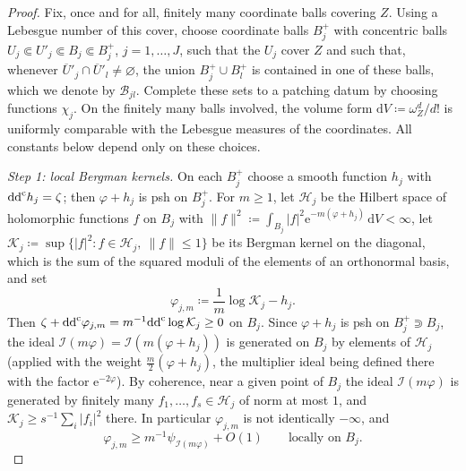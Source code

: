 \documentclass[11pt,a4paper]{amsart}
\theoremstyle{definition}
\begin{document}
\begin{proof}
Fix, once and for all, finitely many coordinate balls covering $Z$. Using a Lebesgue number of this cover, choose coordinate
balls $B_j^+$ with concentric balls $U_j\Subset U'_j\Subset B_j\Subset B_j^+$,
$j=1,\dots,J$, such that the $U_j$ cover $Z$ and such that, whenever
$\overline U{}'_j\cap\overline U{}'_l\ne\varnothing$, the union
$B_j^+\cup B_l^+$ is contained in one of these balls, which we
denote by $\mathcal B_{jl}$. Complete these sets to a patching datum by
choosing functions $\chi_j$. On the finitely many balls involved, the
volume form $\mathrm{d}V\coloneqq\omega_Z^d/d!$ is uniformly comparable
with the Lebesgue measures of the coordinates. All constants below depend
only on these choices.

\emph{Step 1: local Bergman kernels.} On each $B_j^+$ choose a smooth
function $h_j$ with $\mathrm{dd}^{\mathrm{c}} h_j=\zeta$; then $\varphi+h_j$ is psh on
$B_j^+$. For $m\ge1$, let $\mathcal H_{j}$ be the Hilbert space of
holomorphic functions $f$ on $B_j$ with
$\|f\|^2\coloneqq\int_{B_j}|f|^2\mathrm{e}^{-m(\varphi+h_j)}\,\mathrm{d}V<\infty$,
let $\mathcal K_j\coloneqq\sup\{|f|^2:f\in\mathcal H_j,\ \|f\|\le1\}$ be its
Bergman kernel on the diagonal, which is the sum of the squared moduli of
the elements of an orthonormal basis, and set
\[
  \varphi_{j,m}\coloneqq\frac1m\log\mathcal K_j-h_j .
\]
Then $\zeta+\mathrm{dd}^{\mathrm{c}}\varphi_{j,m}=m^{-1}\mathrm{dd}^{\mathrm{c}}\log\mathcal K_j\ge0$ on $B_j$. Since
$\varphi+h_j$ is psh on $B_j^+\Supset B_j$, the ideal
$\mathcal I(m\varphi)=\mathcal I(m(\varphi+h_j))$ is generated on $B_j$ by
elements of $\mathcal H_j$ \cite[Proposition~1.2]{DEL00} (applied with
the weight $\tfrac m2(\varphi+h_j)$, the multiplier ideal being defined
there with the factor $\mathrm{e}^{-2\varphi}$). By coherence, near a
given point of $B_j$ the ideal $\mathcal I(m\varphi)$ is generated by
finitely many $f_1,\dots,f_s\in\mathcal H_j$ of norm at most $1$, and
$\mathcal K_j\ge s^{-1}\sum_i|f_i|^2$ there. In particular $\varphi_{j,m}$ is not
identically $-\infty$, and
\begin{equation}\label{eq:reg-local-lower}
  \varphi_{j,m}\ge m^{-1}\psi_{\mathcal I(m\varphi)}+O(1)
  \qquad\text{locally on }B_j .
\end{equation}


\end{proof}
\end{document}
